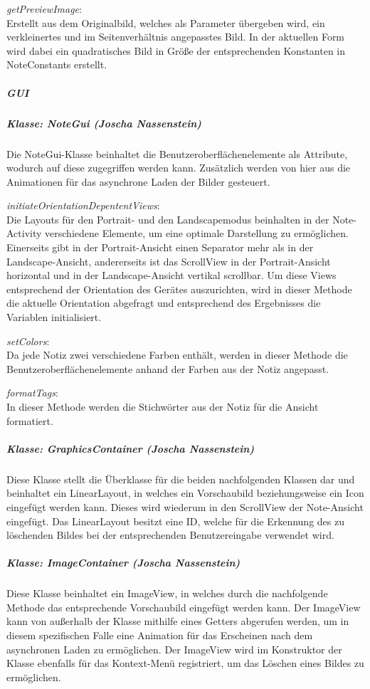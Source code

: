 \textit{getPreviewImage}:\\
Erstellt aus dem Originalbild, welches als Parameter übergeben wird, ein verkleinertes und im Seitenverhältnis angepasstes Bild. In der aktuellen Form wird dabei ein quadratisches Bild in Größe der entsprechenden Konstanten in NoteConstants erstellt.

\subparagraph{GUI}
\subparagraph{Klasse: NoteGui (Joscha Nassenstein)}
Die NoteGui-Klasse beinhaltet die Benutzeroberflächenelemente als Attribute, wodurch auf diese zugegriffen werden kann. Zusätzlich werden von hier aus die Animationen für das asynchrone Laden der Bilder gesteuert.

\textit{initiateOrientationDepententViews}:\\
Die Layouts für den Portrait- und den Landscapemodus beinhalten in der Note-Activity verschiedene Elemente, um eine optimale Darstellung zu ermöglichen. Einerseits gibt in der Portrait-Ansicht einen Separator mehr als in der Landscape-Ansicht, andererseits ist das ScrollView in der Portrait-Ansicht horizontal und in der Landscape-Ansicht vertikal scrollbar. Um diese Views entsprechend der Orientation des Gerätes auszurichten, wird in dieser Methode die aktuelle Orientation abgefragt und entsprechend des Ergebnisses die Variablen initialisiert.

\textit{setColors}:\\
Da jede Notiz zwei verschiedene Farben enthält, werden in dieser Methode die Benutzeroberflächenelemente anhand der Farben aus der Notiz angepasst.

\textit{formatTags}:\\
In dieser Methode werden die Stichwörter aus der Notiz für die Ansicht formatiert.

\subparagraph{Klasse: GraphicsContainer (Joscha Nassenstein)}
Diese Klasse stellt die Überklasse für die beiden nachfolgenden Klassen dar und beinhaltet ein LinearLayout, in welches ein Vorschaubild beziehungsweise ein Icon eingefügt werden kann. Dieses wird wiederum in den ScrollView der Note-Ansicht eingefügt. Das LinearLayout besitzt eine ID, welche für die Erkennung des zu löschenden Bildes bei der entsprechenden Benutzereingabe verwendet wird.

\subparagraph{Klasse: ImageContainer (Joscha Nassenstein)}
Diese Klasse beinhaltet ein ImageView, in welches durch die nachfolgende Methode das entsprechende Vorschaubild eingefügt werden kann. Der ImageView kann von außerhalb der Klasse mithilfe eines Getters abgerufen werden, um in diesem spezifischen Falle eine Animation für das Erscheinen nach dem asynchronen Laden zu ermöglichen. Der ImageView wird im Konstruktor der Klasse ebenfalls für das Kontext-Menü registriert, um das Löschen eines Bildes zu ermöglichen.

